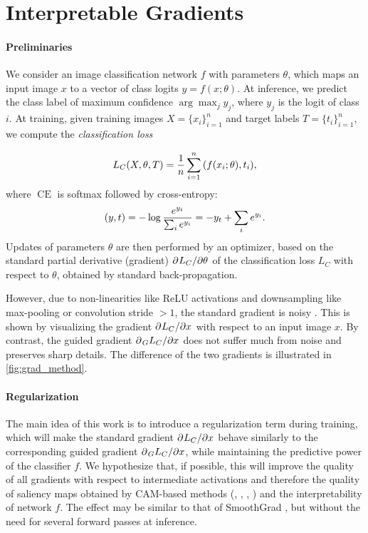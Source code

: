 \section{Interpretable Gradients}
\label{sec:grad_defn}


\paragraph{Preliminaries}

We consider an image classification network $f$ with parameters $\theta$, which maps an input image 
$x$ to a vector of class logits $y = f(x; \theta)$. At inference, we predict the class label of 
maximum confidence $\arg\max_j y_j$, where $y_j$ is the logit of class $i$. At training, given 
training images $X = \{x_i\}_{i=1}^n$ and target labels $T = \{t_i\}_{i=1}^n$, we compute the 
\emph{classification loss}

\begin{equation}
	L_C(X, \theta, T) = \frac{1}{n} \sum_{i=1}^n \ce(f(x_i; \theta), t_i),
\label{eq:class}
\end{equation}
where $\operatorname{CE}$ is softmax followed by cross-entropy:
\begin{equation}
	\ce(y, t) = -\log \frac{e^{y_t}}{\sum_i e^{y_i}} = -y_t + \sum_i e^{y_i}.
\label{eq:ce}
\end{equation}
Updates of parameters $\theta$ are then performed by an optimizer, based on the standard partial 
derivative (gradient) $\partial^{}{L_C}/\partial{\theta^{}}$ of the classification loss $L_C$ with respect to 
$\theta$, obtained by standard back-propagation.

However, due to non-linearities like ReLU activations and downsampling like max-pooling or 
convolution stride $> 1$, the standard gradient is noisy \autocite{smilkov2017smoothgrad}. This 
is shown by visualizing the gradient $\partial^{}{L_C}/\partial{x^{}}$ with respect to an input image $x$. By 
contrast, the guided gradient $\partial^{}{_G L_C}/\partial{x^{}}$ \autocite{guidedbackprop} does not suffer much 
from noise and preserves sharp details. The difference of the two gradients is illustrated in 
\autoref{fig:grad_method}.

\paragraph{Regularization}
The main idea of this work is to introduce a regularization term during training, which will make 
the standard gradient $\partial^{}{L_C}/\partial{x^{}}$ behave similarly to the corresponding guided gradient 
$\partial^{}{_G L_C}/\partial{x^{}}$, while maintaining the predictive power of the classifier $f$. We hypothesize 
that, if possible, this will improve the quality of all gradients with respect to intermediate 
activations and therefore the quality of saliency maps obtained by CAM-based methods 
(\cite{zhou2016learning}, \cite{selvaraju2017grad}, \cite{chattopadhay2018grad}, 
\cite{wang2020score}) and the interpretability of network $f$. The effect may be 
similar to that of SmoothGrad \autocite{smilkov2017smoothgrad}, but without the need for several 
forward passes at inference.

